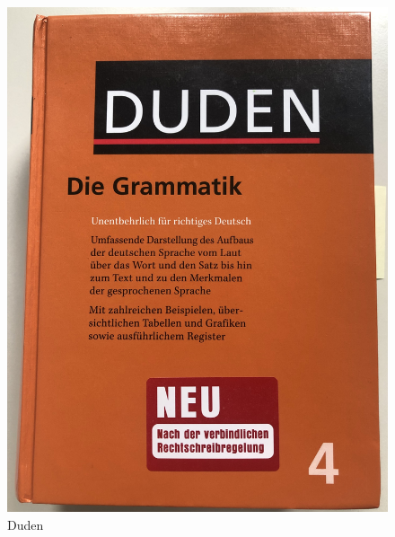 \begin{frame}
\begin{columns}
\begin{column}{.4\textwidth}
\begin{figure}
	\centering
	\includegraphics[scale=.045]{material/DudenRichtigesDeutsch}
	\caption{Duden}\label{Abb3}
\end{figure}

\end{column}

\end{columns}
	
\end{frame}


